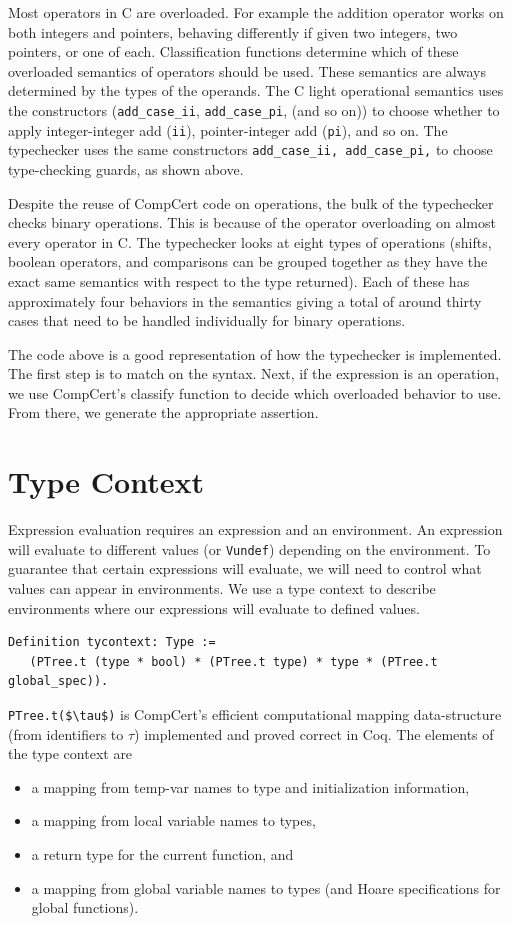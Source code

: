 \documentclass{puthesis}
\begin{document}
Most operators in C are overloaded. For example the addition operator
works on both integers and pointers, behaving differently if given two
integers, two pointers, or one of each. 
Classification functions determine which of these overloaded semantics
of operators should be used. These semantics are always determined by the types
of the operands. 
The C light operational semantics uses
the constructors (\lstinline|add_case_ii|, \lstinline|add_case_pi|, (and so on))
to choose whether to apply integer-integer add (\lstinline|ii|),
pointer-integer add (\lstinline|pi|), and so on.
The typechecker uses the same constructors
\lstinline{add_case_ii, add_case_pi,} to choose
type-checking guards, as shown above.

Despite the reuse of CompCert code on operations, the bulk of the
typechecker checks binary operations. This is because of the operator
overloading on almost every operator in C. The typechecker looks at
eight types of operations (shifts, boolean operators, and comparisons
can be grouped together as they have the exact same semantics with
respect to the type returned). Each of these has approximately four
behaviors in the semantics giving a total of around thirty cases that
need to be handled individually for binary operations.
 
The code above is a good representation of how the typechecker is
implemented. The first step is to match on the syntax. Next, if the expression
is an operation, we use CompCert's classify function to decide which overloaded
behavior to use. From there, we generate the appropriate assertion. 

\section{Type Context}
\label{sec:context}

Expression evaluation requires an expression and an environment. 
An expression will evaluate to different values (or \lstinline|Vundef|)
depending on the environment.  To guarantee that certain expressions will
evaluate, we will need to control what values can
appear in environments. We use a type context to describe environments where
our expressions will evaluate to defined values. 

\begin{lstlisting}
Definition tycontext: Type :=
   (PTree.t (type * bool) * (PTree.t type) * type * (PTree.t global_spec)).
\end{lstlisting}
\lstinline|PTree.t($\tau$)| is CompCert's efficient computational 
mapping data-structure
(from identifiers to $\tau$) implemented
and proved correct in Coq.  
The elements of the type context are
\begin{itemize}
  \item a mapping from temp-var names to type and initialization
  information,
  \item a mapping from local variable names to types,
  \item a return type for the current function, and
  \item a mapping from global variable names to types 
(and Hoare specifications for global functions).
\end{itemize}
\end{document}
